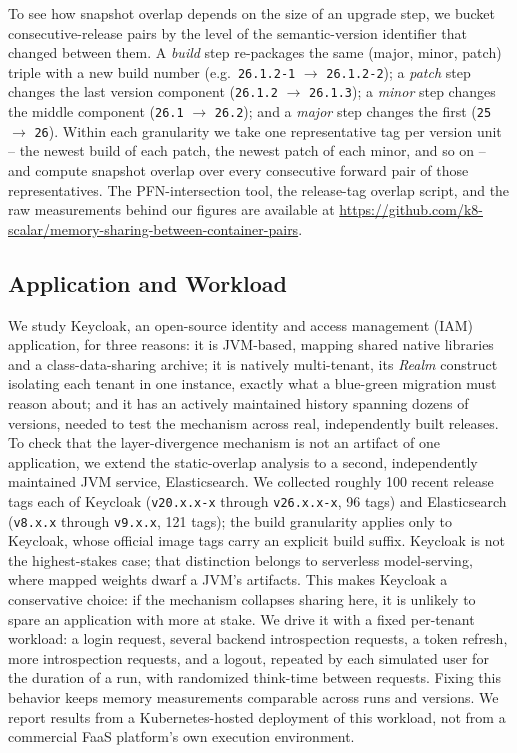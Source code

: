 \documentclass[sigplan,10pt,natbib=false]{acmart}
\begin{document}
To see how snapshot overlap depends on the size of an upgrade step, we
bucket consecutive-release pairs by the level of the semantic-version
identifier that changed between them. A \emph{build} step re-packages
the same (major, minor, patch) triple with a new build number (e.g.\
\texttt{26.1.2-1} $\to$ \texttt{26.1.2-2}); a \emph{patch} step changes
the last version component (\texttt{26.1.2} $\to$ \texttt{26.1.3}); a
\emph{minor} step changes the middle component (\texttt{26.1}
$\to$ \texttt{26.2}); and a \emph{major} step changes the first
(\texttt{25} $\to$ \texttt{26}). Within each granularity we take one
representative tag per version unit -- the newest build of each patch,
the newest patch of each minor, and so on -- and compute snapshot
overlap over every consecutive forward pair of those representatives.
The PFN-intersection tool, the release-tag overlap script, and the raw
measurements behind our figures are available at
\url{https://github.com/k8-scalar/memory-sharing-between-container-pairs}.

\subsection{Application and Workload}
\label{sec:app-workload}

We study Keycloak, an open-source identity and access management (IAM)
application, for three reasons: it is JVM-based, mapping shared native
libraries and a class-data-sharing archive; it is natively multi-tenant, its
\emph{Realm} construct
isolating each tenant in one instance, exactly what a blue-green
migration must reason about; and it has an actively maintained history
spanning dozens of versions, needed to test the mechanism across real,
independently built releases. To check that the layer-divergence
mechanism is not an artifact of one application, we extend the
static-overlap analysis to a second, independently maintained JVM
service, Elasticsearch. We collected roughly 100 recent release tags
each of Keycloak (\texttt{v20.x.x-x} through \texttt{v26.x.x-x}, 96
tags) and Elasticsearch (\texttt{v8.x.x} through \texttt{v9.x.x}, 121
tags); the
build granularity applies only to Keycloak, whose official image tags
carry an explicit build suffix. Keycloak
is not the highest-stakes case; that distinction belongs to serverless
model-serving, where mapped weights dwarf a
JVM's artifacts. This makes Keycloak a conservative choice: if the
mechanism collapses sharing here, it is unlikely to spare an
application with more at stake. We drive it with a fixed
per-tenant workload: a login request, several backend introspection
requests, a token refresh, more introspection requests, and a logout,
repeated by each simulated user for the duration of a run, with
randomized think-time between requests. Fixing this behavior keeps
memory measurements comparable across runs and versions. We report
results from a Kubernetes-hosted deployment of this workload, not from
a commercial FaaS platform's own execution environment.
\end{document}
